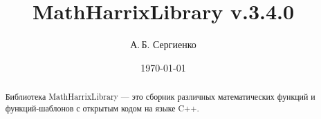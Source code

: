 \documentclass[a4paper,12pt]{article}
\title{MathHarrixLibrary v.3.4.0}
\author{А.\,Б. Сергиенко}
\date{\today}
\begin{document}


\maketitle

\begin{abstract}
Библиотека MathHarrixLibrary --- это сборник различных математических функций и функций-шаблонов с открытым кодом на языке C++.
\end{abstract}

\tableofcontents
\end{document}

